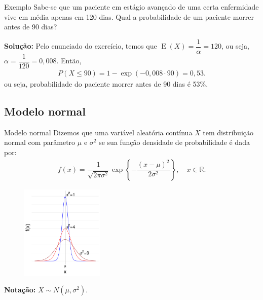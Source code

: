 \documentclass[9pt]{beamer}
\DeclareMathOperator{\espe}{E}
\begin{document}
\begin{frame}{Exemplo}
  Sabe-se que um paciente em estágio avançado de uma certa enfermidade vive em média apenas em 120 dias. Qual a probabilidade de um paciente morrer antes de 90 dias?
  \vfill
 
 \textbf{Solução:}
 Pelo enunciado do exercício, temos que $\espe(X) = \dfrac{1}{\alpha} =  120$, ou seja, $\alpha = \dfrac{1}{120} = 0,008$. Então,
 \begin{align*}
  P(X \leq 90) = 1 - \exp (-0,008 \cdot 90) = 0,53.
 \end{align*}
  ou seja,  probabilidade do paciente morrer antes de 90 dias é 53\%.
\end{frame}

\subsection{Modelo normal}

\begin{frame}{Modelo normal}
Dizemos que uma variável aleatória contínua $X$ tem distribuição normal com parâmetro $\mu$ e $\sigma^2$ se sua função densidade de probabilidade é dada por:
\begin{align*}
 f(x) = \dfrac{1}{\sqrt{2 \pi \sigma^2}} \exp \left\{ -\dfrac{(x-\mu)^2}{2\sigma^2}  \right\}, \quad x \in \mathbb{R}.
\end{align*}

\begin{figure}[ht]
 \centering
 \caption{}
 \includegraphics[height = 4.5cm]{figure/normal.png}
\end{figure}


\textbf{Notação:} $X \sim N(\mu, \sigma^2)$.

\end{frame}
\end{document}
